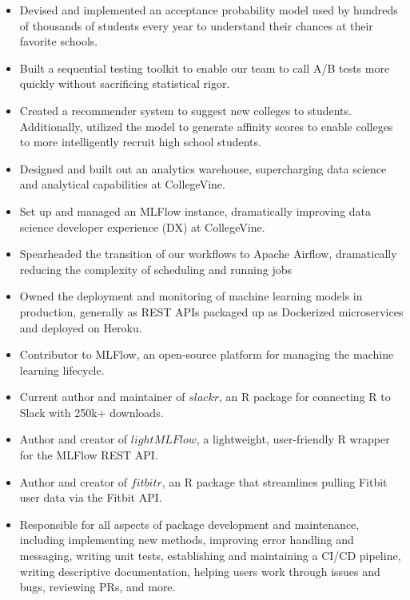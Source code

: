 \documentclass[10pt,a4paper,ragged2e,withhyper]{altacv}
\begin{document}
	

	 	\makecvheader
		
	
		\begin{itemize}
		\item Devised and implemented an acceptance probability model used by hundreds of thousands of students every year to understand their chances at their favorite schools.
		\item Built a sequential testing toolkit to enable our team to call A/B tests more quickly without sacrificing statistical rigor.
		\item Created a recommender system to suggest new colleges to students. Additionally, utilized the model to generate affinity scores to enable colleges to more intelligently recruit high school students.
		\item Designed and built out an analytics warehouse, supercharging data science and analytical capabilities at CollegeVine.
		\item Set up and managed an MLFlow instance,  dramatically improving data science developer experience (DX) at CollegeVine.
		\item Spearheaded the transition of our workflows to Apache Airflow,  dramatically reducing the complexity of scheduling and running jobs
		\item Owned the deployment and monitoring of machine learning models in production, generally as REST APIs packaged up as Dockerized microservices and deployed on Heroku.
		\end{itemize}
		
		\divider
		
		
		\begin{itemize}
		\item Contributor to MLFlow,  an open-source platform for managing the machine learning lifecycle.
		\item Current author and maintainer of $slackr$, an R package for connecting R to Slack with 250k+ downloads.
		\item Author and creator of $lightMLFlow$, a lightweight, user-friendly R wrapper for the MLFlow REST API.
		\item Author and creator of $fitbitr$, an R package that streamlines pulling Fitbit user data via the Fitbit API.
		\item Responsible for all aspects of package development and maintenance, including implementing new methods, improving error handling and messaging, writing unit tests, establishing and maintaining a CI/CD pipeline, writing descriptive documentation, helping users work through issues and bugs, reviewing PRs, and more.
		\end{itemize}
		
\end{document}
